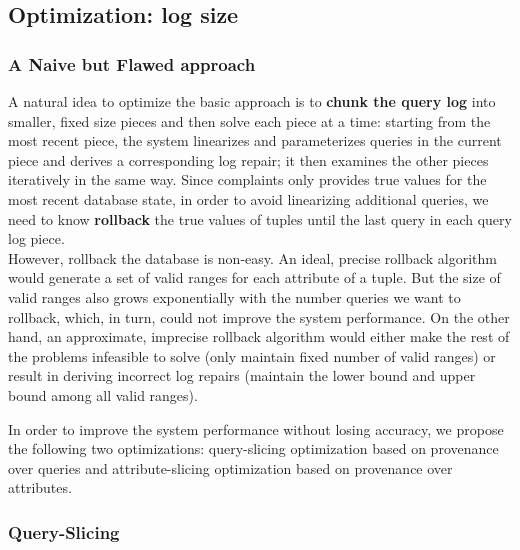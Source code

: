 \subsection{Optimization: log size}


  \subsubsection{A Naive but Flawed approach}
  A natural idea to optimize the basic approach is 
  to \textbf{chunk the query log} into
  smaller, fixed size pieces and then solve each piece at a time: starting
  from the most recent piece, the system linearizes and parameterizes queries 
  in the current piece and derives a corresponding log repair; 
  it then examines the other pieces iteratively
  in the same way. Since complaints only provides
  true values for the most recent database state, in order to avoid 
  linearizing additional queries, 
  we need to know \textbf{rollback} the true values of tuples 
  until the last query in each query log piece. \\
  However, rollback the database is non-easy. An ideal, precise rollback
  algorithm would generate a set of valid ranges for each attribute of a tuple. 
  But the size of valid ranges also grows exponentially with the number queries
  we want to rollback, which, in turn, could not improve the system performance. 
  On the other hand, an approximate, imprecise 
  rollback algorithm would either make the rest of the problems
  infeasible to solve (only maintain fixed number of valid ranges) 
  or result in deriving 
  incorrect log repairs (maintain the lower 
  bound and upper bound among all valid ranges).
    

  In order to improve the system performance without losing accuracy, we propose
  the following two optimizations: query-slicing optimization 
  based on provenance over queries and
  attribute-slicing optimization based on provenance over 
  attributes. 
\fi





\subsubsection{Query-Slicing}
\label{sec:opt:query}


